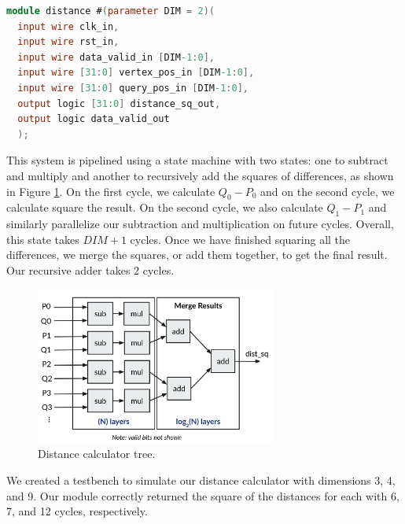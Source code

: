 \documentclass[conference]{IEEEtran}
\begin{document}
\begin{lstlisting}[language=Verilog]
module distance #(parameter DIM = 2)(
  input wire clk_in,
  input wire rst_in,
  input wire data_valid_in [DIM-1:0],
  input wire [31:0] vertex_pos_in [DIM-1:0],
  input wire [31:0] query_pos_in [DIM-1:0],
  output logic [31:0] distance_sq_out,
  output logic data_valid_out
  );
\end{lstlisting}

This system is pipelined using a state machine with two states: one to subtract and multiply and another to recursively add the squares of differences, as shown in Figure \ref{fig:distfig}. On the first cycle, we calculate $Q_0 - P_0$ and on the second cycle, we calculate square the result. On the second cycle, we also calculate $Q_1 - P_1$ and similarly parallelize our subtraction and multiplication on future cycles. Overall, this state takes $DIM+1$ cycles. Once we have finished squaring all the differences, we merge the squares, or add them together, to get the final result. Our recursive adder takes 2 cycles.

\begin{figure}[htbp]
\centerline{\includegraphics[width=8cm]{dist.png}}
\caption{Distance calculator tree. }
\label{fig:distfig}
\end{figure}

We created a testbench to simulate our distance calculator with dimensions 3, 4, and 9. Our module correctly returned the square of the distances for each with 6, 7, and 12 cycles, respectively.
\end{document}
